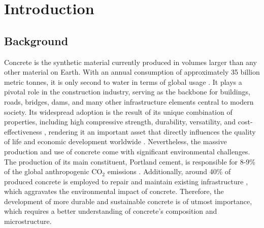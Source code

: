
\chapter{Introduction} %

\label{Chapter1} %



\section{Background}
Concrete is the synthetic material currently produced in volumes larger than any other material on Earth. With an annual consumption of approximately 35 billion metric tonnes, it is only second to water in terms of global usage \cite{mehta2014concrete, Monteiro2017}. It plays a pivotal role in the construction industry, serving as the backbone for buildings, roads, bridges, dams, and many other infrastructure elements central to modern society. Its widespread adoption is the result of its unique combination of properties, including high compressive strength, durability, versatility, and cost-effectiveness \cite{mehta2014concrete}, rendering it an important asset that directly influences the quality of life and economic development worldwide \cite{VanDamme2018, Biernacki2017}. Nevertheless, the massive production and use of concrete come with significant environmental challenges. The production of its main constituent, Portland cement, is responsible for 8-9\% of the global anthropogenic CO$_2$ emissions \cite{Monteiro2017}. Additionally, around 40\% of produced concrete is employed to repair and maintain existing infrastructure \cite{mehta2014concrete}, which aggravates the environmental impact of concrete. Therefore, the development of more durable and sustainable concrete is of utmost importance, which requires a better understanding of concrete's composition and microstructure. 

